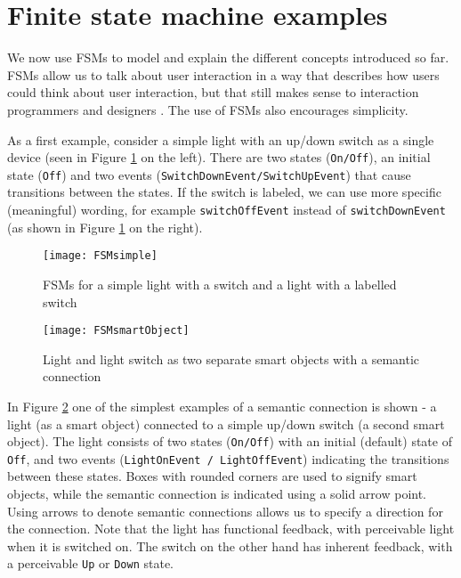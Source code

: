 



\section{Finite state machine examples}
\label{fsmexample}
We now use \acp{FSM} to model and explain the different concepts introduced so far. \acp{FSM} allow us to talk about user interaction in a way that describes how users could think about user interaction, but that still makes sense to interaction programmers and designers \cite{Thimbleby2007}. The use of \acp{FSM} also encourages simplicity. 

As a first example, consider a simple light with an up/down switch as a single device (seen in Figure \ref{FSMsimple} on the left). There are two states (\texttt{On/Off}), an initial state (\texttt{Off}) and two events (\texttt{Switch\-Down\-Event/Switch\-Up\-Event}) that cause transitions be\-tween the states. If the switch is labeled, we can use more specific (meaningful) wording, for example \texttt{switch\-Off\-Event} instead of \texttt{switchDownEvent} (as shown in Figure \ref{FSMsimple} on the right). %

\begin{figure}
\centerline{\texttt{[image: FSMsimple]}}
\caption{FSMs for a simple light with a switch and a light with a labelled switch}
\label{FSMsimple}
\end{figure}

\begin{figure}
\centerline{\texttt{[image: FSMsmartObject]}}
\caption{Light and light switch as two separate smart objects with a semantic connection}
\label{FSMsmartObject}
\end{figure}

In Figure \ref{FSMsmartObject} one of the simplest examples of a semantic connection is shown - a light (as a smart object) connected to a simple up/down switch (a second smart object). The light consists of two states (\texttt{On/Off}) with an initial (default) state of \texttt{Off}, and two events (\texttt{Light\-On\-Event / Light\-Off\-Event}) indicating the transitions be\-tween these states. Boxes with rounded corners are used to signify smart objects, while the semantic connection is indicated using a solid arrow point. Using arrows to denote semantic connections allows us to specify a direction for the connection.  Note that the light has functional feedback, with perceivable light when it is switched on. The switch on the other hand has inherent feedback, with a perceivable \texttt{Up} or \texttt{Down} state.  

